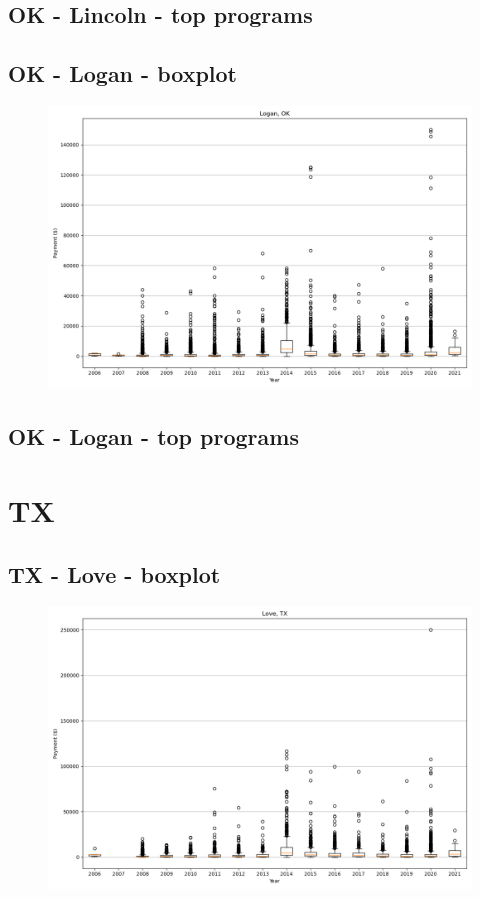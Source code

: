 \subsection*{OK - Lincoln - top programs}

\newpage
\subsection*{OK - Logan - boxplot}
\begin{figure}[h]
\centering
\includegraphics[width=7in]{../output/boxplots/counties/Logan-OK_boxplot.png}
\end{figure}


\subsection*{OK - Logan - top programs}

\newpage
\section*{TX}
\subsection*{TX - Love - boxplot}
\begin{figure}[h]
\centering
\includegraphics[width=7in]{../output/boxplots/counties/Love-TX_boxplot.png}
\end{figure}



